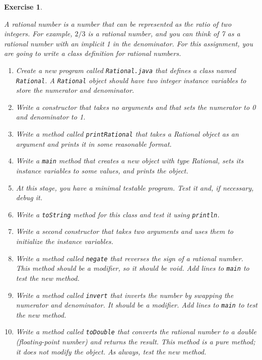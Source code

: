 \documentclass[12pt]{book}
\theoremstyle{exercise}
\newtheorem{exercise}{Exercise}[chapter]
\newcommand{\java}[1]{\verb"#1"}
\newcommand{\java}[1]{\lstinline{#1}} %
\begin{document}
\begin{exercise}
\label{ex.rational}

A rational number is a number that can be represented as the ratio of two integers.
For example, $2/3$ is a rational number, and you can think of 7 as a rational number with an implicit 1 in the denominator.
For this assignment, you are going to write a class definition for rational numbers.

\begin{enumerate}

\item Create a new program called \java{Rational.java} that defines a class named \java{Rational}.
A \java{Rational} object should have two integer instance variables to store the numerator and denominator.

\item Write a constructor that takes no arguments and that sets the numerator to 0 and denominator to 1.

\item Write a method called \java{printRational} that takes a Rational object as an argument and prints it in some reasonable format.

\item Write a \java{main} method that creates a new object with type Rational, sets its instance variables to some values, and prints the object.

\item At this stage, you have a minimal testable program.
Test it and, if necessary, debug it.

\item Write a \java{toString} method for this class and test it using \java{println}.

\item Write a second constructor that takes two arguments and uses them to initialize the instance variables.

\item Write a method called \java{negate} that reverses the sign of a rational number.
This method should be a modifier, so it should be void.
Add lines to \java{main} to test the new method.

\item Write a method called \java{invert} that inverts the number by swapping the numerator and denominator.
It should be a modifier.
Add lines to \java{main} to test the new method.

\item Write a method called \java{toDouble} that converts the rational number to a double (floating-point number) and returns the result.
This method is a pure method; it does not modify the object.
As always, test the new method.


\end{enumerate}
\end{exercise}
\end{document}
